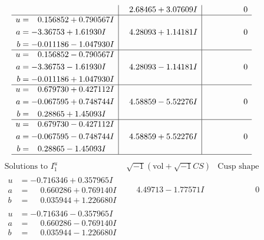 \documentclass[1p]{elsarticle_modified}
\theoremstyle{definition}
\newcommand{\I}{\sqrt{-1}}
\begin{document}
$$\begin{array}{c|c|c}
 & \phantom{-}2.68465 + 3.07609 I & \phantom{-0.000000 } 0 \\ \hline\begin{aligned}
u &= \phantom{-}0.156852 + 0.790567 I \\
a &= -3.36753 + 1.61930 I \\
b &= -0.011186 - 1.047930 I\end{aligned}
 & \phantom{-}4.28093 + 1.14181 I & \phantom{-0.000000 } 0 \\ \hline\begin{aligned}
u &= \phantom{-}0.156852 - 0.790567 I \\
a &= -3.36753 - 1.61930 I \\
b &= -0.011186 + 1.047930 I\end{aligned}
 & \phantom{-}4.28093 - 1.14181 I & \phantom{-0.000000 } 0 \\ \hline\begin{aligned}
u &= \phantom{-}0.679730 + 0.427112 I \\
a &= -0.067595 + 0.748744 I \\
b &= \phantom{-}0.28865 + 1.45093 I\end{aligned}
 & \phantom{-}4.58859 - 5.52276 I & \phantom{-0.000000 } 0 \\ \hline\begin{aligned}
u &= \phantom{-}0.679730 - 0.427112 I \\
a &= -0.067595 - 0.748744 I \\
b &= \phantom{-}0.28865 - 1.45093 I\end{aligned}
 & \phantom{-}4.58859 + 5.52276 I & \phantom{-0.000000 } 0\\
 \hline 
 \end{array}$$\newpage$$\begin{array}{c|c|c}  
\text{Solutions to }I^u_{1}& \I (\text{vol} + \sqrt{-1}CS) & \text{Cusp shape}\\
 \hline 
\begin{aligned}
u &= -0.716346 + 0.357965 I \\
a &= \phantom{-}0.660286 + 0.769140 I \\
b &= \phantom{-}0.035944 + 1.226680 I\end{aligned}
 & \phantom{-}4.49713 - 1.77571 I & \phantom{-0.000000 } 0 \\ \hline\begin{aligned}
u &= -0.716346 - 0.357965 I \\
a &= \phantom{-}0.660286 - 0.769140 I \\
b &= \phantom{-}0.035944 - 1.226680 I\end{aligned}

\end{array}$$
\end{document}
